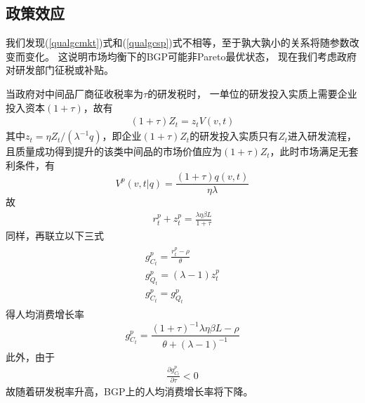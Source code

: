 \documentclass[cn,normal,11pt,black]{elegantnote}
\begin{document}
\subsection{政策效应}

我们发现(\ref{qualgcmkt})式和(\ref{qualgcsp})式不相等，至于孰大孰小的关系将随参数改变而变化。
这说明市场均衡下的BGP可能非Pareto最优状态，
现在我们考虑政府对研发部门征税或补贴。

当政府对中间品厂商征收税率为$\tau$的研发税时，
一单位的研发投入实质上需要企业投入资本$(1+\tau)$，故有
\begin{align}
    (1+\tau)Z_t = z_t  V(v,t)
\end{align}
其中$z_t = \eta Z_t / (\lambda^{-1} q)$，即企业$(1+\tau)Z_t$的研发投入实质只有$Z_t$进入研发流程，
且质量成功得到提升的该类中间品的市场价值应为$(1+\tau)Z_t$，此时市场满足无套利条件，有
\begin{equation}
    V^p(v,t|q) = \frac{(1+\tau)q(v,t)}{ \eta \lambda}
\end{equation}
故
\begin{align}
    r^p_t + z^p_t = \frac{\lambda \eta \beta L}{1+\tau} 
\end{align}
同样，再联立以下三式
\begin{align}
\begin{aligned}
    g_{C_t}^p = \frac{r^p_t -  \rho}{\theta} \\
    g_{Q_t}^p = (\lambda -1)z^p_t \\
    g_{C_t}^p = g_{Q_t}^p
\end{aligned}
\end{align}
得人均消费增长率
\begin{equation}
    g_{C_t}^p=\frac{(1+\tau)^{-1}\lambda \eta \beta L-\rho}{\theta+(\lambda-1)^{-1}}
\end{equation}
此外，由于
\begin{align}
    \frac{\partial g_{C_t}^p}{\partial \tau} < 0
\end{align}
故随着研发税率升高，BGP上的人均消费增长率将下降。
\end{document}
